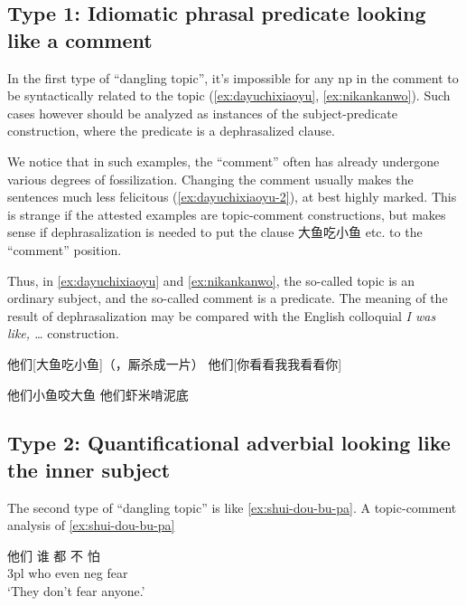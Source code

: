 \documentclass[UTF8, a4paper, oneside, scheme=plain, 12pt]{ctexrep}
\newcommand{\form}[1]{\emph{#1}}
\newcommand{\translate}[1]{`#1'}
\begin{document}
\subsection{Type 1: Idiomatic phrasal predicate looking like a comment}\label{sec:clause.dangling-topic.1}

In the first type of ``dangling topic'',
it's impossible for any \acs{np} in the comment to be syntactically related to the topic
(\ref{ex:dayuchixiaoyu}, \ref{ex:nikankanwo}).
Such cases however should be analyzed as instances of the
subject-predicate construction,
where the predicate is a dephrasalized clause.

We notice that in such examples, 
the ``comment'' often has already undergone various degrees of fossilization.
Changing the comment usually makes the sentences much less felicitous 
(\ref{ex:dayuchixiaoyu-2}),
at best highly marked.
This is strange if the attested examples are topic-comment constructions,
but makes sense if dephrasalization is needed 
to put the clause 大鱼吃小鱼 etc. to the ``comment'' position.

Thus, in \eqref{ex:dayuchixiaoyu} and \eqref{ex:nikankanwo},
the so-called topic is an ordinary subject,
and the so-called comment is a predicate.
The meaning of the result of dephrasalization 
may be compared with the English colloquial 
\form{I was like, \dots} construction.

\begin{exe}
    \ex\label{ex:dayuchixiaoyu} 他们[大鱼吃小鱼]（，厮杀成一片）
    \ex\label{ex:nikankanwo} 他们[你看看我我看看你]
    
    \ex\label{ex:dayuchixiaoyu-2} \begin{xlist}
        \ex *他们小鱼咬大鱼 
        \ex *他们虾米啃泥底
    \end{xlist}
\end{exe}

\subsection{Type 2: Quantificational adverbial looking like the inner subject}

The second type of ``dangling topic'' is like \eqref{ex:shui-dou-bu-pa}.
A topic-comment analysis of \eqref{ex:shui-dou-bu-pa} 

\begin{exe}
    \ex\label{ex:shui-dou-bu-pa} \gll 他们 谁 都 不 怕 \\
    3pl who even \acs{neg} fear \\
    \glt \translate{They don't fear anyone.}
\end{exe}
\end{document}
